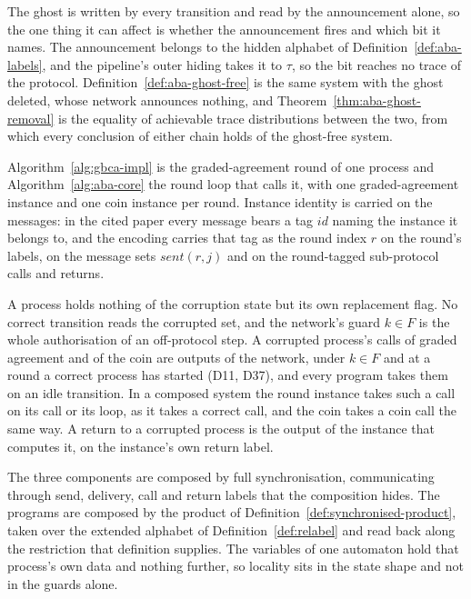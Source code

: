 The ghost is written by every transition and read by the announcement alone, so the one thing it can affect is whether the announcement fires and which bit it names.
The announcement belongs to the hidden alphabet of Definition~\ref{def:aba-labels}, and the pipeline's outer hiding takes it to $\tau$, so the bit reaches no trace of the protocol.
Definition~\ref{def:aba-ghost-free} is the same system with the ghost deleted, whose network announces nothing, and Theorem~\ref{thm:aba-ghost-removal} is the equality of achievable trace distributions between the two, from which every conclusion of either chain holds of the ghost-free system.


Algorithm~\ref{alg:gbca-impl} is the graded-agreement round of one process and
Algorithm~\ref{alg:aba-core} the round loop that calls it, with one
graded-agreement instance and one coin instance per round.
Instance identity is carried on the messages: in the cited paper every message
bears a tag $id$ naming the instance it belongs to, and the encoding carries
that tag as the round index $r$ on the round's labels, on the message sets
$sent(r,j)$ and on the round-tagged sub-protocol calls and returns.


A process holds nothing of the corruption state but its own replacement flag.
No correct transition reads the corrupted set, and the network's guard
$k \in F$ is the whole authorisation of an off-protocol step.
A corrupted process's calls of graded agreement and of the coin are outputs of the
network, under $k \in F$ and at a round a correct process has started (D11, D37),
and every program takes them on an idle transition.
In a composed system the round instance takes such a call on its call or its loop,
as it takes a correct call, and the coin takes a coin call the same way.
A return to a corrupted process is the output of the instance that computes it, on
the instance's own return label.

The three components are composed by full synchronisation, communicating
through send, delivery, call and return labels that the composition hides.
The programs are composed by the product of Definition~\ref{def:synchronised-product},
taken over the extended alphabet of Definition~\ref{def:relabel} and read back
along the restriction that definition supplies.
The variables of one automaton hold that process's own data and nothing further,
so locality sits in the state shape and not in the guards alone.

